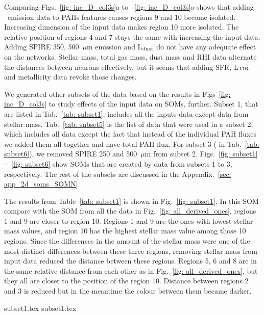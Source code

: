             Comparing Figs.~\ref{fig: inc_D_col3s}a to ~\ref{fig: inc_D_col3s}o shows that adding \halpha~emission data to PAHs features causes regions 9 and 10 become isolated. 
            Increasing dimension of the input data makes region 10 more isolated.
            The relative position of regions 4 and 7 stays the same with increasing the input data. 
            Adding SPIRE 350, 500~$\mu$m emission and L$_{\rm dust}$ do not have any adequate effect on the networks.
            Stellar mass, total gas mass, dust mass and RHI data alternate the distances between neurons effectively, but it seems that adding SFR, L$_{\rm TIR}$ and metallicity data revoke those changes.
            
            We generated other subsets of the data based on the results in Figs~\ref{fig: inc_D_col3s} to study effects of the input data on SOMs, further.
            Subset 1, that are listed in Tab.~\ref{tab: subset1}, includes all the inputs data except data from stellar mass.
            Tab.~\ref{tab: subset5} is the list of data that were used in a subset 2, which includes all data except the fact that instead of the individual PAH fluxes we added them all together and have total PAH flux. 
            For subset 3 ( in Tab.~\ref{tab: subset6}), we removed SPIRE 250 and 500~$\mu$m from subset 2.
            Figs.~\ref{fig: subset1} --~\ref{fig: subset6} show SOMs that are created by data from subsets 1 to 3, respectively.
            The rest of the subsets are discussed in the Appendix.~\ref{sec: app_2d_soms_SOMN}.

            The results from Table~\ref{tab: subset1} is shown in Fig.~\ref{fig: subset1}. 
            In this SOM compare with the SOM from all the data in Fig.~\ref{fig: all_derived_ones}, regions 1 and 9 are closer to region 10. 
            Regions 1 and 9 are the ones with lowest stellar mass values, and region 10 has the highest stellar mass value among those 10 regions. 
            Since the differences in the amount of the stellar mass were one of the most distinct differences between these three regions, removing stellar mass from input data reduced the distance between these regions.
            Regions 5, 6 and 8 are in the same relative distance from each other as in Fig.~\ref{fig: all_derived_ones}, but they all are closer to the position of the region 10.
            Distance between regions 2 and 3 is reduced but in the meantime the colour between them became darker.

            {subset1.tex}
            {subset1.tex}

